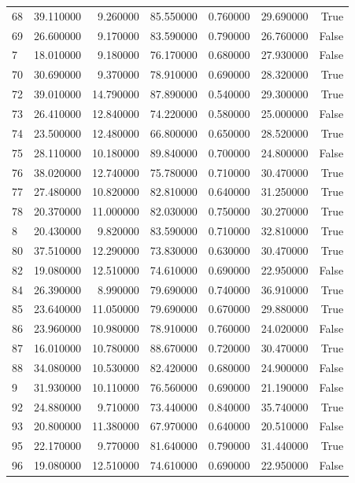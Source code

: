 \begin{table}
\begin{tabular}{lrrrrrr}
68 & 39.110000 & 9.260000 & 85.550000 & 0.760000 & 29.690000 & True \\
69 & 26.600000 & 9.170000 & 83.590000 & 0.790000 & 26.760000 & False \\
7 & 18.010000 & 9.180000 & 76.170000 & 0.680000 & 27.930000 & False \\
70 & 30.690000 & 9.370000 & 78.910000 & 0.690000 & 28.320000 & True \\
72 & 39.010000 & 14.790000 & 87.890000 & 0.540000 & 29.300000 & True \\
73 & 26.410000 & 12.840000 & 74.220000 & 0.580000 & 25.000000 & False \\
74 & 23.500000 & 12.480000 & 66.800000 & 0.650000 & 28.520000 & True \\
75 & 28.110000 & 10.180000 & 89.840000 & 0.700000 & 24.800000 & False \\
76 & 38.020000 & 12.740000 & 75.780000 & 0.710000 & 30.470000 & True \\
77 & 27.480000 & 10.820000 & 82.810000 & 0.640000 & 31.250000 & True \\
78 & 20.370000 & 11.000000 & 82.030000 & 0.750000 & 30.270000 & True \\
8 & 20.430000 & 9.820000 & 83.590000 & 0.710000 & 32.810000 & True \\
80 & 37.510000 & 12.290000 & 73.830000 & 0.630000 & 30.470000 & True \\
82 & 19.080000 & 12.510000 & 74.610000 & 0.690000 & 22.950000 & False \\
84 & 26.390000 & 8.990000 & 79.690000 & 0.740000 & 36.910000 & True \\
85 & 23.640000 & 11.050000 & 79.690000 & 0.670000 & 29.880000 & True \\
86 & 23.960000 & 10.980000 & 78.910000 & 0.760000 & 24.020000 & False \\
87 & 16.010000 & 10.780000 & 88.670000 & 0.720000 & 30.470000 & True \\
88 & 34.080000 & 10.530000 & 82.420000 & 0.680000 & 24.900000 & False \\
9 & 31.930000 & 10.110000 & 76.560000 & 0.690000 & 21.190000 & False \\
92 & 24.880000 & 9.710000 & 73.440000 & 0.840000 & 35.740000 & True \\
93 & 20.800000 & 11.380000 & 67.970000 & 0.640000 & 20.510000 & False \\
95 & 22.170000 & 9.770000 & 81.640000 & 0.790000 & 31.440000 & True \\
96 & 19.080000 & 12.510000 & 74.610000 & 0.690000 & 22.950000 & False \\

\end{tabular}
\end{table}
